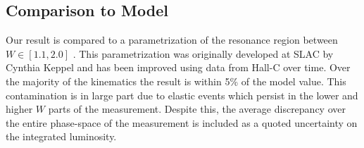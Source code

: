 \subsection{Comparison to Model}
Our result is compared to a parametrization of the resonance region between $W \in [1.1, 2.0]$ \cite{theses-keppel:1994}.  This parametrization was originally developed at SLAC by Cynthia Keppel and has been improved using data from Hall-C over time.  Over the majority of the kinematics the result is within 5\% of the model value.  This contamination is in large part due to elastic events which persist in the lower and higher $W$ parts of the measurement.  Despite this, the average discrepancy over the entire phase-space of the measurement is included as a quoted uncertainty on the integrated luminosity.  



%
%


